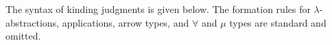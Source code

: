 \documentclass[authoryear, acmsmall, screen, review, nonacm]{acmart}
\begin{document}
\begin{code}%
\>[0]\AgdaSpace{}%
\AgdaSpace{}%
\AgdaSpace{}%
\AgdaSpace{}%
\<%
\\
\>[0][@{}l@{\AgdaIndent{0}}]%
\>[2]\AgdaSpace{}%
\AgdaSymbol{:}\AgdaSpace{}%
\AgdaSymbol{(}\AgdaSpace{}%
\AgdaSpace{}%
\AgdaSpace{}%
\AgdaSymbol{:}\AgdaSpace{}%
\AgdaSpace{}%
\AgdaSpace{}%
\AgdaOperator{\AgdaInductiveConstructor{R[}}\AgdaSpace{}%
\AgdaSpace{}%
\AgdaOperator{\AgdaInductiveConstructor{]}}\AgdaSymbol{)}\AgdaSpace{}%
\AgdaSpace{}%
\AgdaSpace{}%
\AgdaSpace{}%
\AgdaSpace{}%
\AgdaOperator{\AgdaInductiveConstructor{R[}}\AgdaSpace{}%
\AgdaSpace{}%
\AgdaOperator{\AgdaInductiveConstructor{]}}\<%
\\
%
\>[2]\AgdaSpace{}%
\AgdaSymbol{:}\AgdaSpace{}%
\AgdaSymbol{(}\AgdaSpace{}%
\AgdaSpace{}%
\AgdaSymbol{:}\AgdaSpace{}%
\AgdaSpace{}%
\AgdaSpace{}%
\AgdaOperator{\AgdaInductiveConstructor{R[}}\AgdaSpace{}%
\AgdaSpace{}%
\AgdaOperator{\AgdaInductiveConstructor{]}}\AgdaSymbol{)}\AgdaSpace{}%
\AgdaSpace{}%
\AgdaSpace{}%
\AgdaSpace{}%
\AgdaSpace{}%
\AgdaOperator{\AgdaInductiveConstructor{R[}}\AgdaSpace{}%
\AgdaSpace{}%
\AgdaOperator{\AgdaInductiveConstructor{]}}\<%
\end{code}

The syntax of kinding judgments is given below. The formation rules for $\lambda$-abstractions, applications, arrow types, and $\forall$ and $\mu$ types are standard and omitted.
\end{document}
